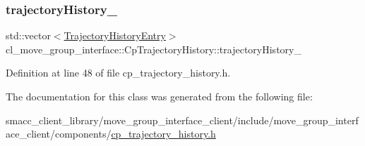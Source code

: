 \subsubsection{\texorpdfstring{trajectory\+History\+\_\+}{trajectoryHistory\_}}
{\footnotesize\ttfamily std\+::vector$<$\hyperlink{structTrajectoryHistoryEntry}{Trajectory\+History\+Entry}$>$ cl\+\_\+move\+\_\+group\+\_\+interface\+::\+Cp\+Trajectory\+History\+::trajectory\+History\+\_\+\hspace{0.3cm}{\ttfamily [private]}}



Definition at line 48 of file cp\+\_\+trajectory\+\_\+history.\+h.



The documentation for this class was generated from the following file\+:\begin{DoxyCompactItemize}
\item 
smacc\+\_\+client\+\_\+library/move\+\_\+group\+\_\+interface\+\_\+client/include/move\+\_\+group\+\_\+interface\+\_\+client/components/\hyperlink{cp__trajectory__history_8h}{cp\+\_\+trajectory\+\_\+history.\+h}\end{DoxyCompactItemize}
